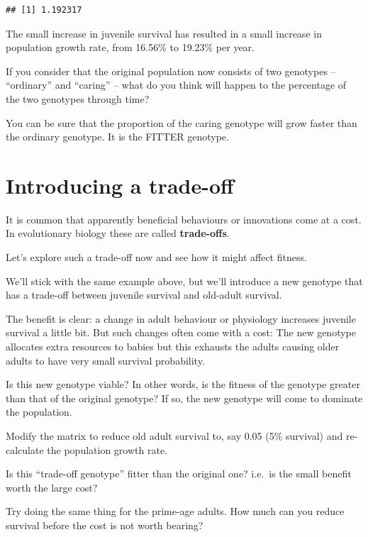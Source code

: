 \documentclass[
  a4paper]{book}
\begin{document}
\begin{verbatim}
## [1] 1.192317
\end{verbatim}

The small increase in juvenile survival has resulted in a small increase in population growth rate, from 16.56\% to 19.23\% per year.

If you consider that the original population now consists of two genotypes -- ``ordinary'' and ``caring'' -- what do you think will happen to the percentage of the two genotypes through time?

You can be sure that the proportion of the caring genotype will grow faster than the ordinary genotype. It is the FITTER genotype.

\section{Introducing a trade-off}\label{introducing-a-trade-off}

It is common that apparently beneficial behaviours or innovations come at a cost. In evolutionary biology these are called \textbf{trade-offs}.

Let's explore such a trade-off now and see how it might affect fitness.

We'll stick with the same example above, but we'll introduce a new genotype that has a trade-off between juvenile survival and old-adult survival.

The benefit is clear: a change in adult behaviour or physiology increases juvenile survival a little bit.
But such changes often come with a cost: The new genotype allocates extra resources to babies but this exhausts the adults causing older adults to have very small survival probability.

Is this new genotype viable? In other words, is the fitness of the genotype greater than that of the original genotype? If so, the new genotype will come to dominate the population.

\begin{do-something}
Modify the matrix to reduce old adult survival to, say 0.05 (5\%
survival) and re-calculate the population growth rate.

Is this ``trade-off genotype'' fitter than the original one? i.e.~is the
small benefit worth the large cost?

Try doing the same thing for the prime-age adults. How much can you
reduce survival before the cost is not worth bearing?
\end{do-something}

  
\end{document}

